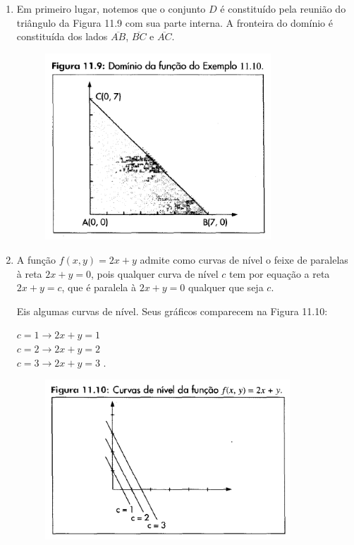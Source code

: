 		\begin{enumerate}[label=\alph*)]

			\item Em primeiro lugar, notemos que o conjunto $D$ é constituído pela reunião do triângulo da Figura 11.9 com sua parte interna. A fronteira do domínio é constituída dos lados $\overline{AB}$, $\overline{BC}$ e $\overline{AC}$.

			\begin{figure}[H]
				\includegraphics[height=7cm]{images/morettin_figura-11-9}
			\end{figure}

			\item A função $f(x, y) = 2x + y$ admite como curvas de nível o feixe de paralelas à reta $2x + y = 0$, pois qualquer curva de nível $c$ tem por equação a reta $2x + y = c$, que é paralela à $2x + y = 0$ qualquer que seja $c$.

			Eis algumas curvas de nível. Seus gráficos comparecem na Figura 11.10:

			\medskip

			$c = 1 \rightarrow 2x + y = 1$ \\
			$c = 2 \rightarrow 2x + y = 2$ \\
			$c = 3 \rightarrow 2x + y = 3$ .

			\begin{figure}[H]
				\includegraphics[height=6cm]{images/morettin_figura-11-10}
			\end{figure}


\end{enumerate}
